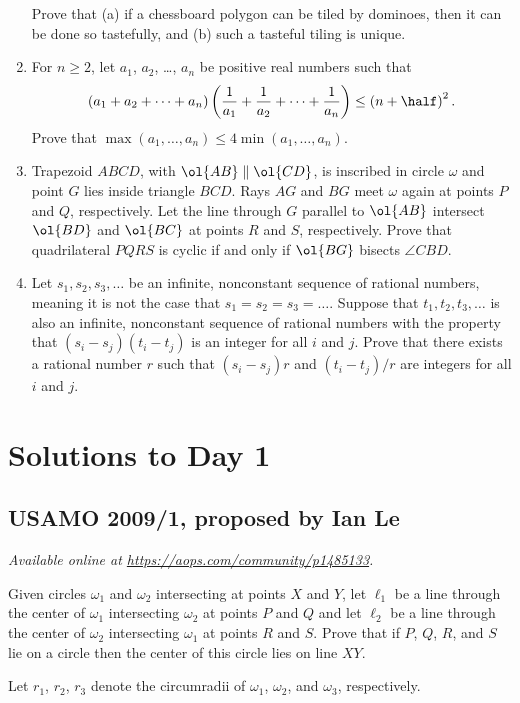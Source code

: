 \documentclass[11pt]{scrartcl}
\begin{document}
\begin{enumerate}[\bfseries 1.]
Prove that (a) if a chessboard polygon can be tiled by dominoes,
then it can be done so tastefully, and (b) such a tasteful tiling is unique.

\item %
For $n \ge 2$, let $a_1$, $a_2$, \dots, $a_n$ be positive real numbers such that
\[
  \left( a_1 + a_2 + \dots + a_n \right)
  \left( \frac{1}{a_1} + \frac{1}{a_2} + \dots + \frac{1}{a_n} \right)
  \le \left( n + \half \right)^2.
\]
Prove that $\max\left( a_1, \dots, a_n \right) \le 4 \min\left( a_1, \dots, a_n \right)$.

\item %
Trapezoid $ABCD$, with $\ol{AB} \parallel \ol{CD}$,
is inscribed in circle $\omega$ and point $G$ lies inside triangle $BCD$.
Rays $AG$ and $BG$ meet $\omega$ again at points $P$ and $Q$, respectively.
Let the line through $G$ parallel to $\ol{AB}$ intersect
$\ol{BD}$ and $\ol{BC}$ at points $R$ and $S$, respectively.
Prove that quadrilateral $PQRS$ is cyclic
if and only if $\ol{BG}$ bisects $\angle CBD$.

\item %
Let $s_1, s_2, s_3, \dots$ be an infinite,
nonconstant sequence of rational numbers,
meaning it is not the case that $s_1 = s_2 = s_3 = \dots$.
Suppose that $t_1, t_2, t_3, \dots$ is also an infinite,
nonconstant sequence of rational numbers
with the property that $(s_i - s_j)(t_i - t_j)$
is an integer for all $i$ and $j$.
Prove that there exists a rational number $r$
such that $(s_i - s_j)r$ and $(t_i - t_j)/r$
are integers for all $i$ and $j$.

\end{enumerate}
\pagebreak

\section{Solutions to Day 1}
\subsection{USAMO 2009/1, proposed by Ian Le}
\textsl{Available online at \url{https://aops.com/community/p1485133}.}
\begin{mdframed}[style=mdpurplebox,frametitle={Problem statement}]
Given circles $\omega_1$ and $\omega_2$ intersecting at points $X$ and $Y$,
let $\ell_1$ be a line through the center of $\omega_1$
intersecting $\omega_2$ at points $P$ and $Q$
and let $\ell_2$ be a line through the center of $\omega_2$
intersecting $\omega_1$ at points $R$ and $S$.
Prove that if $P$, $Q$, $R$, and $S$ lie on a circle
then the center of this circle lies on line $XY$.
\end{mdframed}
Let $r_1$, $r_2$, $r_3$ denote the
circumradii of $\omega_1$, $\omega_2$, and $\omega_3$, respectively.
\end{document}

